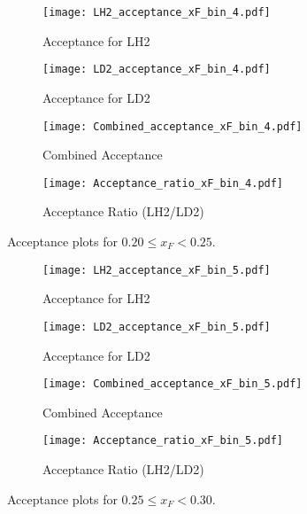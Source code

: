 \documentclass{article}
\begin{document}
\begin{figure}[H]
    \centering
    \begin{subfigure}[b]{0.48\textwidth}
       \texttt{[image: LH2\_acceptance\_xF\_bin\_4.pdf]}
       \caption{Acceptance for LH2}
    \end{subfigure}
    \hfill
    \begin{subfigure}[b]{0.48\textwidth}
       \texttt{[image: LD2\_acceptance\_xF\_bin\_4.pdf]}
       \caption{Acceptance for LD2}
    \end{subfigure}

    \begin{subfigure}[b]{0.48\textwidth}
       \texttt{[image: Combined\_acceptance\_xF\_bin\_4.pdf]}
       \caption{Combined Acceptance}
    \end{subfigure}
    \hfill
    \begin{subfigure}[b]{0.48\textwidth}
       \texttt{[image: Acceptance\_ratio\_xF\_bin\_4.pdf]}
       \caption{Acceptance Ratio (LH2/LD2)}
    \end{subfigure}
    \caption{Acceptance plots for $0.20 \le x_F < 0.25$.}
\end{figure}

\begin{figure}[H]
    \centering
    \begin{subfigure}[b]{0.48\textwidth}
       \texttt{[image: LH2\_acceptance\_xF\_bin\_5.pdf]}
       \caption{Acceptance for LH2}
    \end{subfigure}
    \hfill
    \begin{subfigure}[b]{0.48\textwidth}
       \texttt{[image: LD2\_acceptance\_xF\_bin\_5.pdf]}
       \caption{Acceptance for LD2}
    \end{subfigure}

    \begin{subfigure}[b]{0.48\textwidth}
       \texttt{[image: Combined\_acceptance\_xF\_bin\_5.pdf]}
       \caption{Combined Acceptance}
    \end{subfigure}
    \hfill
    \begin{subfigure}[b]{0.48\textwidth}
       \texttt{[image: Acceptance\_ratio\_xF\_bin\_5.pdf]}
       \caption{Acceptance Ratio (LH2/LD2)}
    \end{subfigure}
    \caption{Acceptance plots for $0.25 \le x_F < 0.30$.}
\end{figure}
\end{document}
